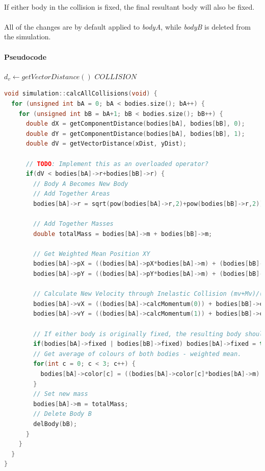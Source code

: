 \paragraph{}
If either body in the collision is fixed, the final resultant body will also be fixed.

\paragraph{}
All of the changes are by default applied to \textit{bodyA}, while \textit{bodyB} is deleted from the simulation.

\pagebreak

\paragraph{Pseudocode}
\begin{algorithmic}[1]
    \STATE $d_v \leftarrow getVectorDistance()$
      \STATE $COLLISION$
    \ENDIF
  \ENDFOR
\ENDFOR
\end{algorithmic}

\begin{lstlisting}[language=c++]
void simulation::calcAllCollisions(void) {
  for (unsigned int bA = 0; bA < bodies.size(); bA++) {
    for (unsigned int bB = bA+1; bB < bodies.size(); bB++) {
      double dX = getComponentDistance(bodies[bA], bodies[bB], 0);
      double dY = getComponentDistance(bodies[bA], bodies[bB], 1);
      double dV = getVectorDistance(xDist, yDist);

      // TODO: Implement this as an overloaded operator?
      if(dV < bodies[bA]->r+bodies[bB]->r) {
        // Body A Becomes New Body
        // Add Together Areas
        bodies[bA]->r = sqrt(pow(bodies[bA]->r,2)+pow(bodies[bB]->r,2));

        // Add Together Masses
        double totalMass = bodies[bA]->m + bodies[bB]->m;

        // Get Weighted Mean Position XY
        bodies[bA]->pX = ((bodies[bA]->pX*bodies[bA]->m) + (bodies[bB]->pX*bodies[bB]->m)) / totalMass;
        bodies[bA]->pY = ((bodies[bA]->pY*bodies[bA]->m) + (bodies[bB]->pY*bodies[bB]->m)) / totalMass;

        // Calculate New Velocity through Inelastic Collision (mv+Mv)/(m+M) = v XY
        bodies[bA]->vX = ((bodies[bA]->calcMomentum(0)) + bodies[bB]->calcMomentum(0)) / totalMass;
        bodies[bA]->vY = ((bodies[bA]->calcMomentum(1)) + bodies[bB]->calcMomentum(1)) / totalMass;

        // If either body is originally fixed, the resulting body should be fixed.
        if(bodies[bA]->fixed | bodies[bB]->fixed) bodies[bA]->fixed = true;
        // Get average of colours of both bodies - weighted mean.
        for(int c = 0; c < 3; c++) {
          bodies[bA]->color[c] = ((bodies[bA]->color[c]*bodies[bA]->m) + (bodies[bB]->color[c]*bodies[bB]->m)) / totalMass;
        }
        // Set new mass
        bodies[bA]->m = totalMass;
        // Delete Body B
        delBody(bB);
      }
    }
  }
}
\end{lstlisting}

